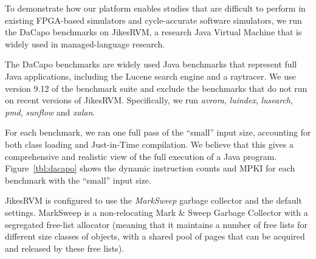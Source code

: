 \begin{table}
\begin{center}
%
\end{center}
\caption{Dynamic instruction counts and MPKI for the DaCapo benchmarks with the ``small'' input size}
\label{tbl:dacapo}
\end{table}

To demonstrate how our platform enables studies that are difficult to perform
in existing FPGA-based simulators and cycle-accurate software simulators, we
run the DaCapo benchmarks on JikesRVM, a research Java Virtual Machine that is
widely used in managed-language research.

The DaCapo benchmarks are widely used Java benchmarks that represent full Java
applications, including the Lucene search engine and a raytracer. We use
version 9.12 of the benchmark suite and exclude the benchmarks that do not run
on recent versions of JikesRVM. Specifically, we run \emph{avrora},
\emph{luindex}, \emph{lusearch}, \emph{pmd}, \emph{sunflow} and \emph{xalan}.

For each benchmark, we ran one full pass of the ``small'' input size,
accounting for both class loading and Just-in-Time compilation. We believe that
this gives a comprehensive and realistic view of the full execution of a Java
program. Figure~\ref{tbl:dacapo} shows the dynamic instruction counts and MPKI
for each benchmark with the ``small'' input size.

JikesRVM is configured to use the \emph{MarkSweep} garbage collector and the
default settings. MarkSweep is a non-relocating Mark \& Sweep Garbage Collector
with a segregated free-list allocator (meaning that it maintains a number of
free lists for different size classes of objects, with a shared pool of pages
that can be acquired and released by these free lists).
